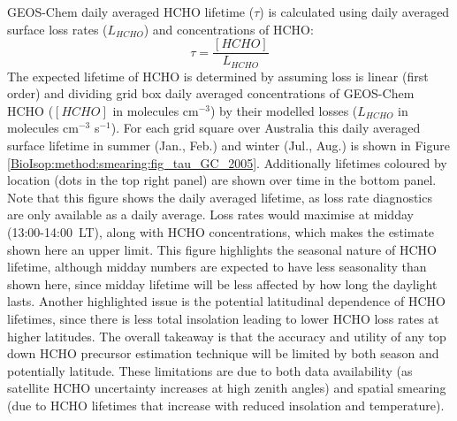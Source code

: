       
      
      GEOS-Chem daily averaged HCHO lifetime ($\tau$) is calculated using daily averaged surface loss rates ($L_{HCHO}$) and concentrations of HCHO:
      \begin{equation*}
      \tau = \frac{[HCHO]}{L_{HCHO}}
      \end{equation*}
      The expected lifetime of HCHO is determined by assuming loss is linear (first order) and dividing grid box daily averaged concentrations of GEOS-Chem HCHO ($[HCHO]$ in molecules cm$^{-3}$) by their modelled losses ($L_{HCHO}$ in molecules cm$^{-3}$ s$^{-1}$).
      For each grid square over Australia this daily averaged surface lifetime in summer (Jan., Feb.) and winter (Jul., Aug.) is shown in Figure \ref{BioIsop:method:smearing:fig_tau_GC_2005}.
      Additionally lifetimes coloured by location (dots in the top right panel) are shown over time in the bottom panel.
      Note that this figure shows the daily averaged lifetime, as loss rate diagnostics are only available as a daily average.
      Loss rates would maximise at midday (13:00-14:00~LT), along with HCHO concentrations, which makes the estimate shown here an upper limit. 
      This figure highlights the seasonal nature of HCHO lifetime, although midday numbers are expected to have less seasonality than shown here, since midday lifetime will be less affected by how long the daylight lasts.
      Another highlighted issue is the potential latitudinal dependence of HCHO lifetimes, since there is less total insolation leading to lower HCHO loss rates at higher latitudes.
      The overall takeaway is that the accuracy and utility of any top down HCHO precursor estimation technique will be limited by both season and potentially latitude.
      These limitations are due to both data availability (as satellite HCHO uncertainty increases at high zenith angles) and spatial smearing (due to HCHO lifetimes that increase with reduced insolation and temperature).
      
